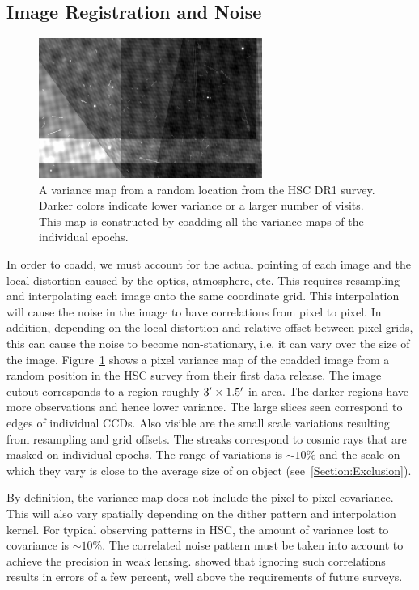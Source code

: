 \documentclass[fleqn,useAMS,usenatbib]{mnras}
\begin{document}
\subsection{Image Registration and Noise}
\label{Subsection:Registration}
\begin{figure}
\includegraphics[width=0.65\textwidth]{CoaddNoise.png}
\caption{
A variance map from a random location from the HSC DR1 survey.  Darker colors 
indicate lower variance or a larger number of visits.  This map is constructed 
by coadding all the variance maps of the individual epochs.
}
\label{fig:noise}
\end{figure}

In order to coadd, we must account for the actual pointing of each image and 
the local distortion caused by the optics, atmosphere, etc.  This requires 
resampling and interpolating each image onto the same coordinate grid.  This 
interpolation will cause the noise in the image to have correlations from pixel 
to pixel.  In addition, depending on the local distortion and relative offset 
between pixel grids, this can cause the noise to become non-stationary, i.e. it 
can vary over the size of the image.  Figure~\ref{fig:noise} shows a pixel 
variance map of the coadded image from a random position in the HSC survey 
\cite{HSC_DR1} from their first data release.  The image cutout corresponds to 
a region roughly $3\hbox{$^\prime$} \times 1.5\hbox{$^\prime$}$ in area.  The darker regions have 
more observations and hence lower variance.  The large slices seen correspond 
to edges of individual CCDs.  Also visible are the small scale variations 
resulting from resampling and grid offsets.  The streaks correspond to cosmic 
rays that are masked on individual epochs.  The range of variations is 
$\sim10\%$ and the scale on which they vary is close to the average size of on 
object (see~\ref{Section:Exclusion}).

By definition, the variance map does not include the pixel to pixel covariance. 
This will also vary spatially depending on the dither pattern and 
interpolation kernel.  For typical observing patterns in HSC, the amount of 
variance lost to covariance is $\sim 10\%$.  The correlated noise pattern must be 
taken into account to achieve the precision in weak lensing. \cite{Gurvich2016} 
showed that ignoring such correlations results in errors of a few percent, well 
above the requirements of future surveys.  
\end{document}
